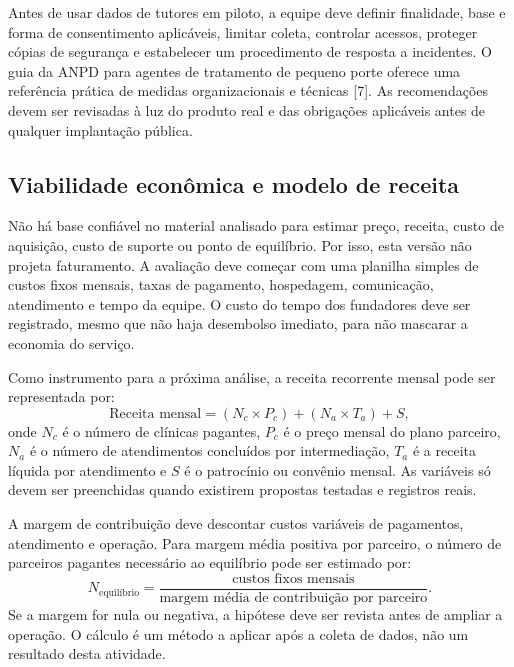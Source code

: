 \documentclass[12pt,a4paper]{article}
\begin{document}
Antes de usar dados de tutores em piloto, a equipe deve definir finalidade, base e forma de consentimento aplicáveis, limitar coleta, controlar acessos, proteger cópias de segurança e estabelecer um procedimento de resposta a incidentes. O guia da ANPD para agentes de tratamento de pequeno porte oferece uma referência prática de medidas organizacionais e técnicas [7]. As recomendações devem ser revisadas à luz do produto real e das obrigações aplicáveis antes de qualquer implantação pública.

\subsection{Viabilidade econômica e modelo de receita}

Não há base confiável no material analisado para estimar preço, receita, custo de aquisição, custo de suporte ou ponto de equilíbrio. Por isso, esta versão não projeta faturamento. A avaliação deve começar com uma planilha simples de custos fixos mensais, taxas de pagamento, hospedagem, comunicação, atendimento e tempo da equipe. O custo do tempo dos fundadores deve ser registrado, mesmo que não haja desembolso imediato, para não mascarar a economia do serviço.

Como instrumento para a próxima análise, a receita recorrente mensal pode ser representada por:
\[
\text{Receita mensal} = (N_c \times P_c) + (N_a \times T_a) + S,
\]
onde $N_c$ é o número de clínicas pagantes, $P_c$ é o preço mensal do plano parceiro, $N_a$ é o número de atendimentos concluídos por intermediação, $T_a$ é a receita líquida por atendimento e $S$ é o patrocínio ou convênio mensal. As variáveis só devem ser preenchidas quando existirem propostas testadas e registros reais.

A margem de contribuição deve descontar custos variáveis de pagamentos, atendimento e operação. Para margem média positiva por parceiro, o número de parceiros pagantes necessário ao equilíbrio pode ser estimado por:
\[
N_{\text{equilíbrio}} = \frac{\text{custos fixos mensais}}{\text{margem média de contribuição por parceiro}}.
\]
Se a margem for nula ou negativa, a hipótese deve ser revista antes de ampliar a operação. O cálculo é um método a aplicar após a coleta de dados, não um resultado desta atividade.
\end{document}
